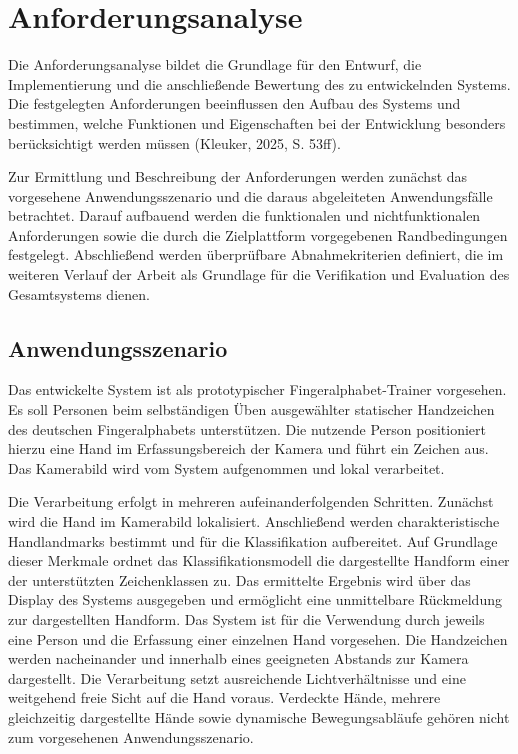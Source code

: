 \chapter{Anforderungsanalyse}

Die Anforderungsanalyse bildet die Grundlage für den Entwurf, die Implementierung und die anschließende Bewertung des zu entwickelnden Systems. Die festgelegten Anforderungen beeinflussen den Aufbau des Systems und bestimmen, welche Funktionen und Eigenschaften bei der Entwicklung besonders berücksichtigt werden müssen (Kleuker, 2025, S. 53ff).

Zur Ermittlung und Beschreibung der Anforderungen werden zunächst das vorgesehene Anwendungsszenario und die daraus abgeleiteten Anwendungsfälle betrachtet. Darauf aufbauend werden die funktionalen und nichtfunktionalen Anforderungen sowie die durch die Zielplattform vorgegebenen Randbedingungen festgelegt. Abschließend werden überprüfbare Abnahmekriterien definiert, die im weiteren Verlauf der Arbeit als Grundlage für die Verifikation und Evaluation des Gesamtsystems dienen.

\section{Anwendungsszenario}
Das entwickelte System ist als prototypischer Fingeralphabet-Trainer vorgesehen. Es soll Personen beim selbständigen Üben ausgewählter statischer Handzeichen des deutschen Fingeralphabets unterstützen. Die nutzende Person positioniert hierzu eine Hand im Erfassungsbereich der Kamera und führt ein Zeichen aus. Das Kamerabild wird vom System aufgenommen und lokal verarbeitet.

Die Verarbeitung erfolgt in mehreren aufeinanderfolgenden Schritten. Zunächst wird die Hand im Kamerabild lokalisiert. Anschließend werden charakteristische Handlandmarks bestimmt und für die Klassifikation aufbereitet. Auf Grundlage dieser Merkmale ordnet das Klassifikationsmodell die dargestellte Handform einer der unterstützten Zeichenklassen zu. Das ermittelte Ergebnis wird über das Display des Systems ausgegeben und ermöglicht eine unmittelbare Rückmeldung zur dargestellten Handform. Das System ist für die Verwendung durch jeweils eine Person und die Erfassung einer einzelnen Hand vorgesehen. Die Handzeichen werden nacheinander und innerhalb eines geeigneten Abstands zur Kamera dargestellt. Die Verarbeitung setzt ausreichende Lichtverhältnisse und eine weitgehend freie Sicht auf die Hand voraus. Verdeckte Hände, mehrere gleichzeitig dargestellte Hände sowie dynamische Bewegungsabläufe gehören nicht zum vorgesehenen Anwendungsszenario.


